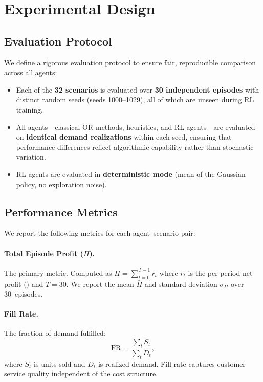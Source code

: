
\section{Experimental Design}\label{sec:design}

\subsection{Evaluation Protocol}

We define a rigorous evaluation protocol to ensure fair, reproducible
comparison across all agents:

\begin{itemize}
  \item Each of the \textbf{32 scenarios} is evaluated over
        \textbf{30 independent episodes} with distinct random seeds
        (seeds 1000--1029), all of which are unseen during RL training.
  \item All agents---classical OR methods, heuristics, and RL
        agents---are evaluated on \textbf{identical demand
        realizations} within each seed, ensuring that performance
        differences reflect algorithmic capability rather than
        stochastic variation.
  \item RL agents are evaluated in \textbf{deterministic mode} (mean
        of the Gaussian policy, no exploration noise).
\end{itemize}

\subsection{Performance Metrics}

We report the following metrics for each agent--scenario pair:

\paragraph{Total Episode Profit ($\Pi$).}
The primary metric. Computed as $\Pi = \sum_{t=0}^{T-1} r_t$ where
$r_t$ is the per-period net profit () and $T = 30$.
We report the mean $\bar{\Pi}$ and standard deviation $\sigma_\Pi$
over 30~episodes.

\paragraph{Fill Rate.}
The fraction of demand fulfilled:
\begin{equation}\label{eq:fill_rate}
  \text{FR} = \frac{\sum_{t} S_t}{\sum_{t} D_t},
\end{equation}
where $S_t$ is units sold and $D_t$ is realized demand. Fill rate
captures customer service quality independent of the cost structure.

